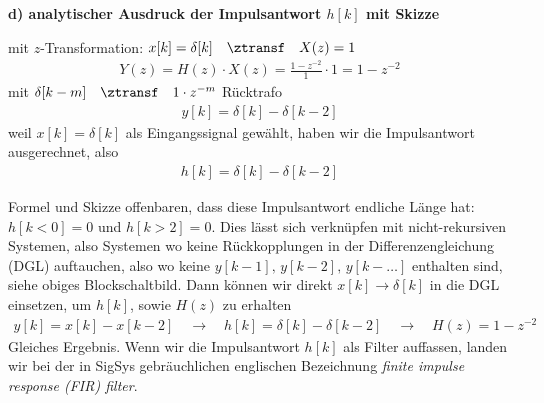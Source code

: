 \begin{Loesung}
\begin{center}
\end{center}

\textbf{d) analytischer Ausdruck der Impulsantwort $h[k]$ mit Skizze}
%

mit $z$-Transformation: $x[k] = \delta[k] \quad\ztransf\quad X(z) = 1$
%
\begin{align}
Y(z) = H(z) \cdot X(z) = \frac{1-z^{-2}}{1} \cdot 1 = 1-z^{-2}
\end{align}
%
mit $\delta[k-m]  \quad\ztransf\quad 1 \cdot z^{-m}$ Rücktrafo
%
\begin{align}
y[k] = \delta[k] - \delta[k-2]
\end{align}
%
weil $x[k] = \delta[k]$ als Eingangssignal gewählt, haben wir die Impulsantwort
ausgerechnet, also
%
\begin{align}
h[k] = \delta[k] - \delta[k-2]
\end{align}
%
\begin{center}
\end{center}
%
Formel und Skizze offenbaren, dass diese Impulsantwort endliche Länge hat:
$h[k<0] =0$ und $h[k>2] = 0$.
%
Dies lässt sich verknüpfen mit nicht-rekursiven Systemen, also Systemen
wo keine Rückkopplungen in der Differenzengleichung (DGL) auftauchen,
also wo keine $y[k-1],\,y[k-2],\,y[k-\dots]$ enthalten sind, siehe obiges Blockschaltbild.
%
Dann können wir direkt
$x[k]\rightarrow \delta[k]$ in die DGL einsetzen, um $h[k]$, sowie $H(z)$ zu erhalten
\begin{align}
y[k] = x[k] - x[k-2]
\quad\rightarrow\quad
h[k] = \delta[k] - \delta[k-2]
\quad\rightarrow\quad
H(z) = 1 - z^{-2}
\end{align}
Gleiches Ergebnis. Wenn wir die Impulsantwort $h[k]$ als
Filter auffassen, landen wir bei der in SigSys gebräuchlichen englischen
Bezeichnung \textit{finite impulse response (FIR) filter}.


\end{Loesung}
